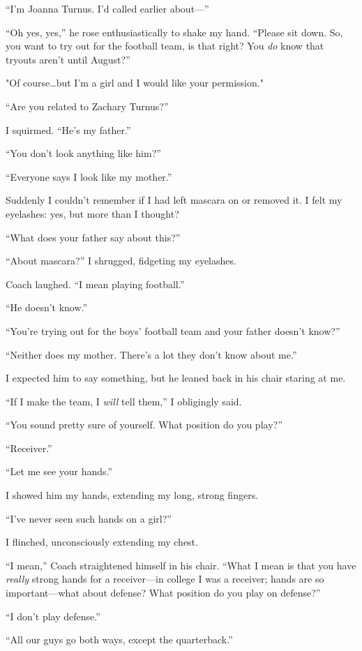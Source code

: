 ``I'm Joanna Turnus. I'd called earlier about---''

``Oh yes, yes,'' he rose enthusiastically to shake my hand. ``Please sit
down. So, you want to try out for the football team, is that right? You
\emph{do} know that tryouts aren't until August?''

"Of course\ldots but I'm a girl and I would like your permission."

``Are you related to Zachary Turnus?''

I squirmed. ``He's my father.''

``You don't look anything like him?''

``Everyone says I look like my mother.''

Suddenly I couldn't remember if I had left mascara on or removed it. I
felt my eyelashes: yes, but more than I thought?

``What does your father say about this?''

``About mascara?'' I shrugged, fidgeting my eyelashes.

Coach laughed. ``I mean playing football.''

``He doesn't know.''

``You're trying out for the boys' football team and your father doesn't
know?''

``Neither does my mother. There's a lot they don't know about me.''

I expected him to say something, but he leaned back in his chair staring
at me.

``If I make the team, I \emph{will} tell them,'' I obligingly said.

``You sound pretty sure of yourself. What position do you play?''

``Receiver.''

``Let me see your hands.''

I showed him my hands, extending my long, strong fingers.

``I've never seen such hands on a girl?''

I flinched, unconsciously extending my chest.

``I mean,'' Coach straightened himself in his chair. ``What I mean is
that you have \emph{really} strong hands for a receiver---in college I
was a receiver; hands are so important---what about defense? What
position do you play on defense?''

``I don't play defense.''

``All our guys go both ways, except the quarterback.''

